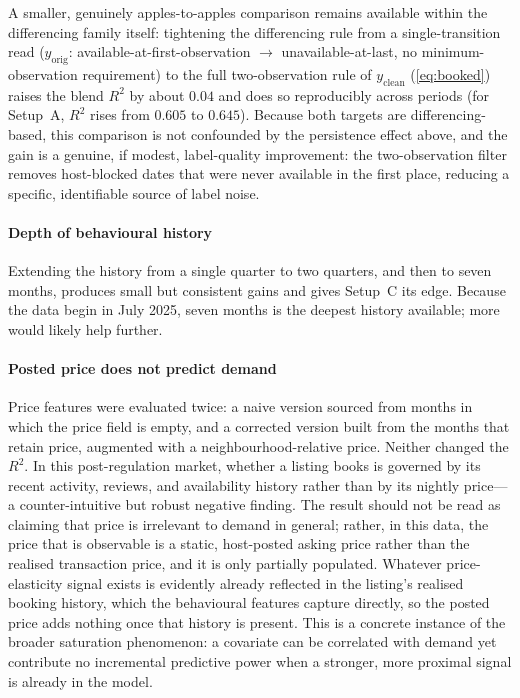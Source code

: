\documentclass[review,12pt]{elsarticle}
\begin{document}
A smaller, genuinely apples-to-apples comparison remains available within the
differencing family itself: tightening the differencing rule from a
single-transition read ($y_{\text{orig}}$: available-at-first-observation
$\rightarrow$ unavailable-at-last, no minimum-observation requirement) to the full
two-observation rule of $y_{\text{clean}}$ (\eqref{eq:booked}) raises the blend
$R^2$ by about $0.04$ and does so reproducibly across periods (for Setup~A, $R^2$
rises from $0.605$ to $0.645$). Because both targets are differencing-based, this
comparison is not confounded by the persistence effect above, and the gain is a
genuine, if modest, label-quality improvement: the two-observation filter removes
host-blocked dates that were never available in the first place, reducing a
specific, identifiable source of label noise.

\paragraph{Depth of behavioural history}
Extending the history from a single quarter to two quarters, and then to seven
months, produces small but consistent gains and gives Setup~C its edge. Because the
data begin in July 2025, seven months is the deepest history available; more would
likely help further.

\paragraph{Posted price does not predict demand}
Price features were evaluated twice: a naive version sourced from months in which
the price field is empty, and a corrected version built from the months that
retain price, augmented with a neighbourhood-relative price. Neither changed the
$R^2$. In this post-regulation market, whether a listing books is governed by its
recent activity, reviews, and availability history rather than by its nightly
price---a counter-intuitive but robust negative finding. The result should not be
read as claiming that price is irrelevant to demand in general; rather, in this
data, the price that is observable is a static, host-posted asking price rather than
the realised transaction price, and it is only partially populated. Whatever
price-elasticity signal exists is evidently already reflected in the listing's
realised booking history, which the behavioural features capture directly, so the
posted price adds nothing once that history is present. This is a concrete instance
of the broader saturation phenomenon: a covariate can be correlated with demand yet
contribute no incremental predictive power when a stronger, more proximal signal is
already in the model.
\end{document}
